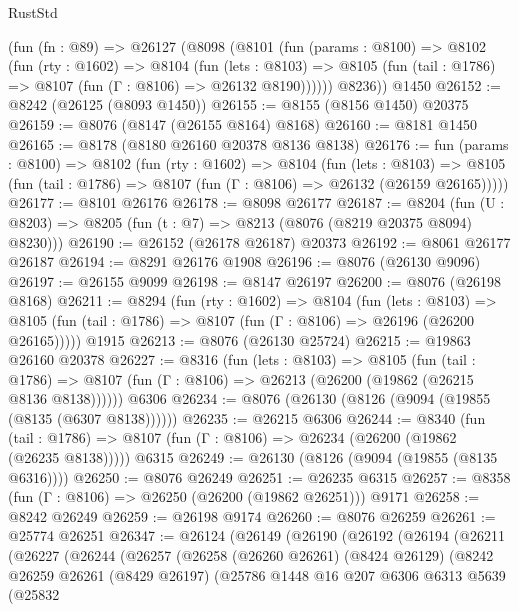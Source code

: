 \begin{lexlean}{RustStd}
\begin{coremodule}
    (fun (fn : @89) =>
    @26127
      (@8098
        (@8101
          (fun (params : @8100) =>
          @8102
            (fun (rty : @1602) =>
            @8104
              (fun (lets : @8103) =>
              @8105 (fun (tail : @1786) => @8107 (fun (Γ : @8106) => @26132 @8190))))))
        @8236))
    @1450
@26152 := @8242 (@26125 (@8093 @1450))
@26155 := @8155 (@8156 @1450) @20375
@26159 := @8076 (@8147 (@26155 @8164) @8168)
@26160 := @8181 @1450
@26165 := @8178 (@8180 @26160 @20378 @8136 @8138)
@26176 := fun (params : @8100) =>
  @8102
    (fun (rty : @1602) =>
    @8104
      (fun (lets : @8103) =>
      @8105 (fun (tail : @1786) => @8107 (fun (Γ : @8106) => @26132 (@26159 @26165)))))
@26177 := @8101 @26176
@26178 := @8098 @26177
@26187 := @8204
    (fun (U : @8203) => @8205 (fun (t : @7) => @8213 (@8076 (@8219 @20375 @8094) @8230)))
@26190 := @26152 (@26178 @26187) @20373
@26192 := @8061 @26177 @26187
@26194 := @8291 @26176 @1908
@26196 := @8076 (@26130 @9096)
@26197 := @26155 @9099
@26198 := @8147 @26197
@26200 := @8076 (@26198 @8168)
@26211 := @8294
    (fun (rty : @1602) =>
    @8104
      (fun (lets : @8103) =>
      @8105 (fun (tail : @1786) => @8107 (fun (Γ : @8106) => @26196 (@26200 @26165)))))
    @1915
@26213 := @8076 (@26130 @25724)
@26215 := @19863 @26160 @20378
@26227 := @8316
    (fun (lets : @8103) =>
    @8105
      (fun (tail : @1786) =>
      @8107 (fun (Γ : @8106) => @26213 (@26200 (@19862 (@26215 @8136 @8138))))))
    @6306
@26234 := @8076 (@26130 (@8126 (@9094 (@19855 (@8135 (@6307 @8138))))))
@26235 := @26215 @6306
@26244 := @8340
    (fun (tail : @1786) => @8107 (fun (Γ : @8106) => @26234 (@26200 (@19862 (@26235 @8138)))))
    @6315
@26249 := @26130 (@8126 (@9094 (@19855 (@8135 @6316))))
@26250 := @8076 @26249
@26251 := @26235 @6315
@26257 := @8358 (fun (Γ : @8106) => @26250 (@26200 (@19862 @26251))) @9171
@26258 := @8242 @26249
@26259 := @26198 @9174
@26260 := @8076 @26259
@26261 := @25774 @26251
@26347 := @26124
    (@26149
      (@26190
        (@26192
          (@26194
            (@26211
              (@26227
                (@26244
                  (@26257
                    (@26258
                      (@26260 @26261)
                      (@8424 @26129)
                      (@8242
                        @26259
                        @26261
                        (@8429 @26197)
                        (@25786
                          @1448
                          @16
                          @207
                          @6306
                          @6313
                          @5639
                          (@25832

\end{coremodule}
\end{lexlean}
